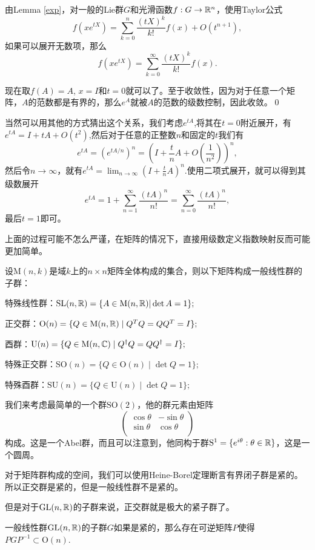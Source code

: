 \proof 由Lemma \ref{exp}，对一般的Lie群$G$和光滑函数$f:G\to \mathbb{R}^n$，使用Taylor公式
\[
	f(xe^{tX})=\sum_{k=0}^n\frac{(tX)^{k}}{k!}f(x)+O(t^{n+1}),
\]
如果可以展开无数项，那么
\[
	f(xe^{tX})=\sum_{k=0}^\infty\frac{(tX)^{k}}{k!}f(x).
\]

现在取$f(A)=A$, $x=I$和$t=0$就可以了。至于收敛性，因为对于任意一个矩阵，$A$的范数都是有界的，那么$e^A$就被$A$的范数的级数控制，因此收敛。\qed

当然可以用其他的方式猜出这个关系，我们考虑$e^{tA}$,将其在$t=0$附近展开，有$e^{tA}=I+tA+O(t^2)$,然后对于任意的正整数$n$和固定的$t$我们有
\[
	e^{tA}=\left(e^{tA/n}\right)^n=\left(I+\frac{t}{n}A+O\left(\frac{1}{n^2}\right)\right)^n,
\]
然后令$n\to\infty$，就有$e^{tA}=\lim_{n\to\infty}\left(I+\frac{t}{n}A\right)^n$.使用二项式展开，就可以得到其级数展开
\[
	e^{tA}=1+\sum_{n=1}^\infty \frac{(tA)^n}{n!}=\sum_{n=0}^\infty \frac{(tA)^n}{n!},
\]
最后$t=1$即可。

上面的过程可能不怎么严谨，在矩阵的情况下，直接用级数定义指数映射反而可能更加简单。

\para 设$\mathrm{M}(n,k)$是域$k$上的$n\times n$矩阵全体构成的集合，则以下矩阵构成一般线性群的子群：

 特殊线性群：$\mathrm{SL}(n,\mathbb{R})=\{A\in \mathrm{M}(n,\mathbb{R})|\det A=1\};$

 正交群：$\mathrm{O}(n) = \{ Q \in \mathrm{M}(n,\mathbb{R}) \mid Q^T Q = Q Q^T = I \};$

 酉群：$\mathrm{U}(n) = \{ Q \in \mathrm{M}(n,\mathbb{C}) \mid Q^\dag Q = Q Q^\dag = I \};$

 特殊正交群：$\mathrm{SO}(n) =\{ Q \in \mathrm{O}(n) \mid \det Q=1 \};$

 特殊酉群：$\mathrm{SU}(n) =\{ Q \in \mathrm{U}(n) \mid \det Q=1 \};$

我们来考虑最简单的一个群$\mathrm{SO}(2)$，他的群元素由矩阵
\[
	\begin{pmatrix}
	\cos \theta&-\sin \theta\\
	\sin \theta&\cos \theta\\
	\end{pmatrix}
\]
构成。这是一个Abel群，而且可以注意到，他同构于群$\mathrm{S}^1=\{e^{i\theta}:\theta\in\mathbb{R}\}$，这是一个圆周。

\pro 对于矩阵群构成的空间，我们可以使用Heine-Borel定理断言有界闭子群是紧的。所以正交群是紧的，但是一般线性群不是紧的。

但是对于$\mathrm{GL}(n,\mathbb{R})$的子群来说，正交群就是极大的紧子群了。

\pro 一般线性群$\mathrm{GL}(n,\mathbb{R})$的子群$G$如果是紧的，那么存在可逆矩阵$P$使得$PGP^{-1}\subset \mathrm{O}(n)$.

